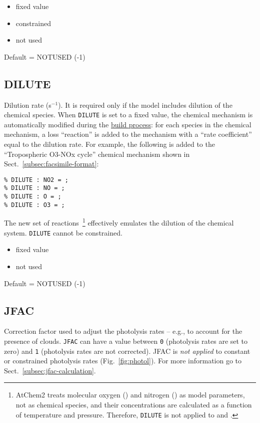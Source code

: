\begin{itemize}
\item fixed value
\item constrained
\item not used
\end{itemize}

Default = NOTUSED (-1)

\subsection{DILUTE} \label{subsec:dilute}

Dilution rate (s$^{-1}$). It is required only if the model includes
dilution of the chemical species. When \texttt{DILUTE} is set to a
fixed value, the chemical mechanism is automatically modified during
the \hyperref[subsec:build-process]{build process}: for each species
in the chemical mechanism, a loss ``reaction'' is added to the
mechanism with a ``rate coefficient'' equal to the dilution rate. For
example, the following is added to the ``Tropospheric O3-NOx cycle''
chemical mechanism shown in Sect.~\ref{subsec:facsimile-format}:

\begin{verbatim}
% DILUTE : NO2 = ;
% DILUTE : NO = ;
% DILUTE : O = ;
% DILUTE : O3 = ;
\end{verbatim}

The new set of reactions~\footnote{AtChem2 treats molecular oxygen
  () and nitrogen () as model parameters, not as
  chemical species, and their concentrations are calculated as a
  function of temperature and pressure. Therefore, \texttt{DILUTE} is
  not applied to  and .} effectively emulates the
dilution of the chemical system. \texttt{DILUTE} cannot be
constrained.

\begin{itemize}
\item fixed value
\item not used
\end{itemize}

Default = NOTUSED (-1)

\subsection{JFAC} \label{subsec:jfac}

Correction factor used to adjust the photolysis rates -- e.g., to
account for the presence of clouds. \texttt{JFAC} can have a value
between \texttt{0} (photolysis rates are set to zero) and \texttt{1}
(photolysis rates are not corrected). JFAC is \emph{not applied} to
constant or constrained photolysis rates (Fig.~\ref{fig:photol}). For
more information go to Sect.~\ref{subsec:jfac-calculation}.

